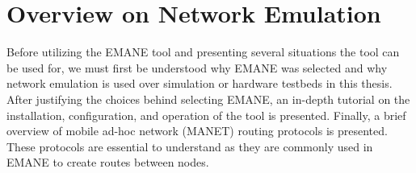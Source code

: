 \chapter{Overview on Network Emulation}
\label{chapter2}
Before utilizing the EMANE tool and presenting several situations the tool can be used for, we must first be understood why EMANE was selected and why network emulation is used over simulation or hardware testbeds in this thesis.
After justifying the choices behind selecting EMANE, an in-depth tutorial on the installation, configuration, and operation of the tool is presented.
Finally, a brief overview of mobile ad-hoc network (MANET) routing protocols is presented.
These protocols are essential to understand as they are commonly used in EMANE to create routes between nodes.\par


